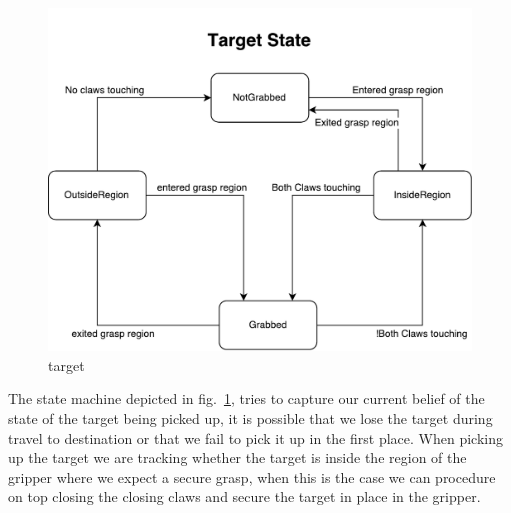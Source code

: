 \begin{figure}
\centering
\includegraphics[width=.8\linewidth]{figures/statediagrams/target.pdf}
\caption{target}
\label{fig:target}
\end{figure}

The state machine depicted in fig.~\ref{fig:target}, tries to capture our current belief of the state of the target being picked up, it is possible that we lose the target during travel to destination or that we fail to pick it up in the first place. When picking up the target we are tracking whether the target is inside the region of the gripper where we expect a secure grasp, when this is the case we can procedure on top closing the closing claws and secure the target in place in the gripper.
